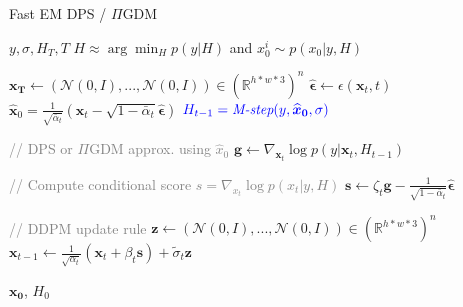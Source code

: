 \documentclass[10pt,twocolumn,letterpaper]{article}
\newcommand{\mycomment}[1]{\textcolor{gray}{// #1}}
\begin{document}
\begin{algorithm}[t]\small
    \caption{Fast EM DPS / $\Pi$GDM}
    \label{alg:fast_diffEM}
    \begin{algorithmic}
        \Require $y, \sigma, H_T, T$
        \Ensure $H \approx \arg\min_{H} p(y|H)$ and %
        $x_0^i \sim p(x_0|y,H)$

        \State $\boldsymbol{x_T} \gets (\mathcal{N}(0,I), ..., \mathcal{N}(0,I)) \in (\mathbb{R}^{h*w*3})^n$ 
            \State $\boldsymbol{\widehat{\epsilon}} \gets \epsilon(\boldsymbol{x}_t, t)$
            \State $\boldsymbol{\widehat{x}}_0 = \frac{1}{\sqrt{\bar{\alpha}_t}}(\boldsymbol{x}_t - \sqrt{1-\bar{\alpha}_t}\boldsymbol{\widehat{\epsilon}})$
            \State $\color{blue}{H_{t-1} = \textit{M-step}(y, \boldsymbol{\widehat{x}_0}, \sigma)}$ 
            
            \State \mycomment{DPS or $\Pi$GDM approx. using $\hat{x}_0$}
            \State $\boldsymbol{g} \gets \nabla_{\boldsymbol{x}_t} \log p(y|\boldsymbol{x}_t, H_{t-1}) $ 

            \State \mycomment{Compute conditional score $s=\nabla_{x_t}\log p(x_t|y,H)$}
            \State $\boldsymbol{s} \gets  \zeta_{t} \boldsymbol{g} - \frac{1}{\sqrt{1-\bar\alpha_t}}\boldsymbol{\hat{\epsilon}}$ 

            \State \mycomment{DDPM update rule}
            \State $ \boldsymbol{z} \gets (\mathcal{N}(0,I), ..., \mathcal{N}(0,I)) \in (\mathbb{R}^{h*w*3})^n$
            \State $\boldsymbol{x}_{t-1} \gets \frac{1}{\sqrt{\alpha_t}}\left( \boldsymbol{x}_t + \beta_t \boldsymbol{s}\right) + \tilde\sigma_t \boldsymbol{z}$
            
        \EndFor
        \State \Return $\boldsymbol{x_0}$, $H_{0}$
    \end{algorithmic}
\end{algorithm}

%
%
\end{document}
